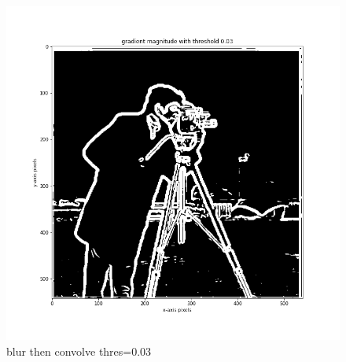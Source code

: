 \documentclass{article}
\begin{document}
\begin{figure}[!htb]
    \includegraphics[width=\linewidth]{blur then convolve with threshold.png}
    \caption{blur then convolve thres=0.03}\label{fig:awesome_image2}
\endminipage


\end{figure}
\end{document}
